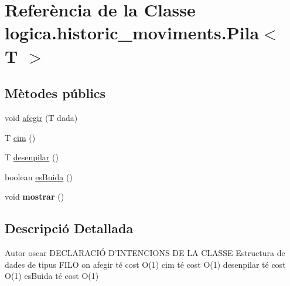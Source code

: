 \hypertarget{classlogica_1_1historic__moviments_1_1_pila_3_01_t_01_4}{\section{Referència de la Classe logica.\+historic\+\_\+moviments.\+Pila$<$ T $>$}
\label{classlogica_1_1historic__moviments_1_1_pila_3_01_t_01_4}
}
\subsection*{Mètodes públics}
\begin{DoxyCompactItemize}
\item 
void \hyperlink{classlogica_1_1historic__moviments_1_1_pila_3_01_t_01_4_a4c7677e80d1a2e750036374680e8de69}{afegir} (T dada)
\item 
T \hyperlink{classlogica_1_1historic__moviments_1_1_pila_3_01_t_01_4_ada68762ef342309936234ed5976a5f89}{cim} ()
\item 
T \hyperlink{classlogica_1_1historic__moviments_1_1_pila_3_01_t_01_4_a4eee9c634e4eb6a3a7fe84132374cee5}{desenpilar} ()
\item 
boolean \hyperlink{classlogica_1_1historic__moviments_1_1_pila_3_01_t_01_4_a8eb489a3420043963be8160a873f6d65}{es\+Buida} ()
\item 
\hypertarget{classlogica_1_1historic__moviments_1_1_pila_3_01_t_01_4_aa59bd41773dcd55120094efd43a04aaa}{void {\bfseries mostrar} ()}\label{classlogica_1_1historic__moviments_1_1_pila_3_01_t_01_4_aa59bd41773dcd55120094efd43a04aaa}

\end{DoxyCompactItemize}


\subsection{Descripció Detallada}
\begin{DoxyAuthor}{Autor}
oscar D\+E\+C\+L\+A\+R\+A\+C\+IÓ D'I\+N\+T\+E\+N\+C\+I\+O\+N\+S D\+E L\+A C\+L\+A\+S\+S\+E Estructura de dades de tipus F\+I\+L\+O on afegir té cost O(1) cim té cost O(1) desenpilar té cost O(1) es\+Buida té cost O(1) 
\end{DoxyAuthor}


